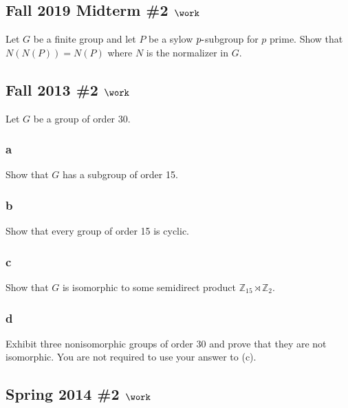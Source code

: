 \hypertarget{fall-2019-midterm-2-work}{%
\subsection{\texorpdfstring{Fall 2019 Midterm \#2
\(\work\)}{Fall 2019 Midterm \#2 \textbackslash work}}\label{fall-2019-midterm-2-work}}

Let \(G\) be a finite group and let \(P\) be a sylow
\(p{\hbox{-}}\)subgroup for \(p\) prime. Show that \(N(N(P)) = N(P)\)
where \(N\) is the normalizer in \(G\).

\hypertarget{fall-2013-2-work}{%
\subsection{\texorpdfstring{Fall 2013 \#2
\(\work\)}{Fall 2013 \#2 \textbackslash work}}\label{fall-2013-2-work}}

Let \(G\) be a group of order 30.

\hypertarget{a-3}{%
\subsubsection{a}\label{a-3}}

Show that \(G\) has a subgroup of order 15.

\hypertarget{b-3}{%
\subsubsection{b}\label{b-3}}

Show that every group of order 15 is cyclic.

\hypertarget{c-2}{%
\subsubsection{c}\label{c-2}}

Show that \(G\) is isomorphic to some semidirect product
\({\mathbb{Z}}_{15} \rtimes{\mathbb{Z}}_2\).

\hypertarget{d}{%
\subsubsection{d}\label{d}}

Exhibit three nonisomorphic groups of order 30 and prove that they are
not isomorphic. You are not required to use your answer to (c).

\hypertarget{spring-2014-2-work}{%
\subsection{\texorpdfstring{Spring 2014 \#2
\(\work\)}{Spring 2014 \#2 \textbackslash work}}\label{spring-2014-2-work}}

